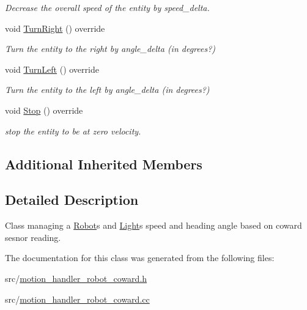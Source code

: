 \begin{DoxyCompactItemize}
\begin{DoxyCompactList}\small\item\em Decrease the overall speed of the entity by speed\+\_\+delta. \end{DoxyCompactList}\item 
void \hyperlink{class_motion_handler_robot_coward_ad1244c83f6c9f81d28f1080dbe955e89}{Turn\+Right} () override\hypertarget{class_motion_handler_robot_coward_ad1244c83f6c9f81d28f1080dbe955e89}{}\label{class_motion_handler_robot_coward_ad1244c83f6c9f81d28f1080dbe955e89}

\begin{DoxyCompactList}\small\item\em Turn the entity to the right by angle\+\_\+delta (in degrees?) \end{DoxyCompactList}\item 
void \hyperlink{class_motion_handler_robot_coward_af0f39f6289c90aa5d8e1db3fee3bf6f0}{Turn\+Left} () override\hypertarget{class_motion_handler_robot_coward_af0f39f6289c90aa5d8e1db3fee3bf6f0}{}\label{class_motion_handler_robot_coward_af0f39f6289c90aa5d8e1db3fee3bf6f0}

\begin{DoxyCompactList}\small\item\em Turn the entity to the left by angle\+\_\+delta (in degrees?) \end{DoxyCompactList}\item 
void \hyperlink{class_motion_handler_robot_coward_a532bf275aa6bd551378c581a890ba54f}{Stop} () override\hypertarget{class_motion_handler_robot_coward_a532bf275aa6bd551378c581a890ba54f}{}\label{class_motion_handler_robot_coward_a532bf275aa6bd551378c581a890ba54f}

\begin{DoxyCompactList}\small\item\em stop the entity to be at zero velocity. \end{DoxyCompactList}\end{DoxyCompactItemize}
\subsection*{Additional Inherited Members}


\subsection{Detailed Description}
Class managing a \hyperlink{class_robot}{Robot}\textquotesingle{}s and \hyperlink{class_light}{Light}\textquotesingle{}s speed and heading angle based on coward sesnor reading. 

The documentation for this class was generated from the following files\+:\begin{DoxyCompactItemize}
\item 
src/\hyperlink{motion__handler__robot__coward_8h}{motion\+\_\+handler\+\_\+robot\+\_\+coward.\+h}\item 
src/\hyperlink{motion__handler__robot__coward_8cc}{motion\+\_\+handler\+\_\+robot\+\_\+coward.\+cc}\end{DoxyCompactItemize}
